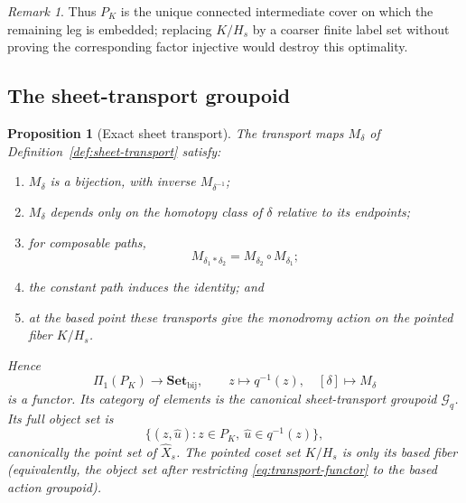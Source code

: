 \documentclass[11pt,reqno]{amsart}
\newtheorem{proposition}[theorem]{Proposition}
\theoremstyle{definition}
\theoremstyle{remark}
\newtheorem{remark}[theorem]{Remark}
\begin{document}
\begin{remark}
Thus \( P_K \) is the unique connected intermediate cover on which the
remaining leg is embedded; replacing \( K/H_s \) by a coarser finite
label set without proving the corresponding factor injective would
destroy this optimality.
\end{remark}

\subsection{The sheet-transport groupoid}
\begin{proposition}[Exact sheet transport]\label{prop:transport}
The transport maps \( M_\delta \) of Definition~\ref{def:sheet-transport} satisfy:
\begin{enumerate}
\item \( M_\delta \) is a bijection, with inverse \( M_{\delta^{-1}} \);
\item \( M_\delta \) depends only on the homotopy class of \( \delta \) relative to its endpoints;
\item for composable paths,
\begin{equation}\label{eq:transport-functorial}
  M_{\delta_1*\delta_2}=M_{\delta_2}\circ M_{\delta_1};
\end{equation}
\item the constant path induces the identity; and
\item at the based point these transports give the monodromy action on the pointed fiber \( K/H_s \).
\end{enumerate}
Hence
\begin{equation}\label{eq:transport-functor}
  \Pi_1(P_K)\longrightarrow\mathbf{Set}_{\mathrm{bij}},
  \qquad
  z\longmapsto q^{-1}(z),\quad
  [\delta]\longmapsto M_\delta
\end{equation}
is a functor.  Its category of elements is the canonical sheet-transport groupoid \( \mathcal G_q \).  Its full object set is
\[
  \bigl\{(z,\widehat u): z\in P_K,\ \widehat u\in q^{-1}(z)\bigr\},
\]
canonically the point set of \( \widehat X_s \).  The pointed coset set \( K/H_s \) is only its based fiber (equivalently, the object set after restricting \eqref{eq:transport-functor} to the based action groupoid).
\end{proposition}
\end{document}
